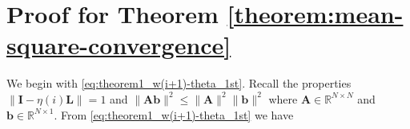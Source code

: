 \documentclass[journal]{IEEEtran}
\begin{document}
\section{Proof for Theorem \ref{theorem:mean-square-convergence}} \label{sec:append_proof_theorem:mean_square_conv}
%
%

{}{We begin with \eqref{eq:theorem1_w(i+1)-theta_1st}. Recall the properties $\big\|\mathbf{I}-\eta(i)\mathbf{L}\big\| = 1$ and $\|\mathbf{A}\mathbf{b}\|^2 \le \|\mathbf{A}\|^2\|\mathbf{b}\|^2$ where $\mathbf{A} \in \mathbb{R}^{N \times N}$ and $\mathbf{b} \in \mathbb{R}^{N \times 1}$. From \eqref{eq:theorem1_w(i+1)-theta_1st} we have}
\end{document}
